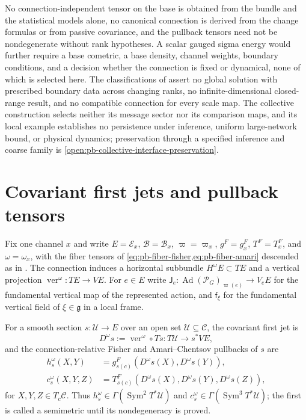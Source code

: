 No connection-independent tensor on the base is obtained from the bundle and the statistical models
alone, no canonical connection is derived from the change formulas or from passive covariance, and
the pullback tensors need not be nondegenerate without rank hypotheses. A scalar gauged sigma energy would further
require a base cometric, a base density, channel weights, boundary conditions, and a decision whether
the connection is fixed or dynamical, none of which is selected here. The classifications of
 assert no global solution with prescribed boundary data
across changing ranks, no infinite-dimensional closed-range result, and no compatible connection for
every scale map. The collective construction selects neither its message sector nor its comparison
maps, and its local example establishes no persistence under inference, uniform large-network
bound, or physical dynamics; preservation through a specified inference and coarse family is
\cref{open:pb-collective-interface-preservation}. 

\section{Covariant first jets and pullback tensors}
\label{sec:pb-covariant-jets}

Fix one channel \(x\) and write \(E=\mathcal E_x\), \(\mathcal B=\mathcal B_x\),
\(\varpi=\varpi_x\), \(g^F=g^F_x\), \(T^F=T^F_x\), and \(\omega=\omega_x\), with the fiber tensors of
\cref{eq:pb-fiber-fisher,eq:pb-fiber-amari} descended as in .
The connection induces a horizontal subbundle \(H^\omega E\subset TE\) and a vertical projection
\(\operatorname{ver}^\omega:TE\to VE\). For \(e\in E\) write
\(\mathsf J_e:\operatorname{Ad}(\mathscr P_G)_{\varpi(e)}\to V_eE\) for the fundamental vertical map
of the represented action, and \(\mathsf f_\xi\) for the fundamental vertical field of
\(\xi\in\mathfrak g\) in a local frame.

For a smooth section \(s:\mathcal U\to E\) over an open set \(\mathcal U\subseteq\mathcal C\), the
covariant first jet is
\begin{equation}
D^\omega s
:=\operatorname{ver}^{\omega}\circ Ts
:T\mathcal U\longrightarrow s^*VE,
\label{eq:pb-covariant-first-jet}
\end{equation}
and the connection-relative Fisher and Amari--Chentsov pullbacks of \(s\) are
\begin{align}
h_s^\omega(X,Y)
&=g^F_{s(c)}(D^\omega s(X),D^\omega s(Y)),
\label{eq:pb-fisher-pullback}\\
c_s^\omega(X,Y,Z)
&=T^F_{s(c)}(D^\omega s(X),D^\omega s(Y),D^\omega s(Z)),
\label{eq:pb-amari-pullback}
\end{align}
for \(X,Y,Z\in T_c\mathcal C\). Thus \(h_s^\omega\in\Gamma(\operatorname{Sym}^2T^*\mathcal U)\) and
\(c_s^\omega\in\Gamma(\operatorname{Sym}^3T^*\mathcal U)\); the first is called a semimetric until
its nondegeneracy is proved.

